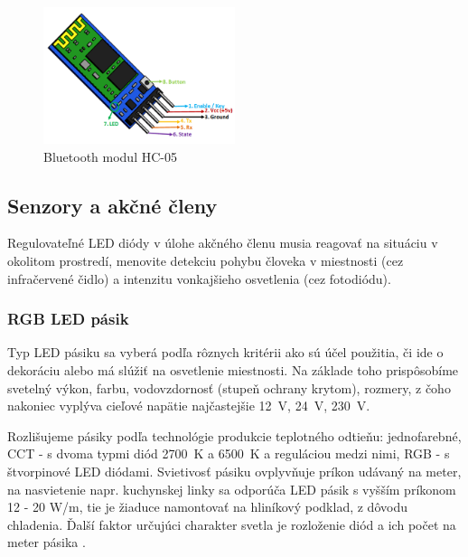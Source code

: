 \documentclass[12pt, a4paper]{article}
\begin{document}
\begin{figure}[h]
	\centering
	\includegraphics[width=0.5\textwidth]{assets/hc-05.png}
	\caption{Bluetooth modul HC-05 \cite{noauthor_hc-05_nodate}}
	\label{fig:hc-05}
\end{figure}

\subsection{Senzory a akčné členy}
Regulovateľné LED diódy v úlohe akčného členu musia reagovať na situáciu v okolitom prostredí, menovite detekciu pohybu človeka v miestnosti (cez infračervené čidlo) a intenzitu vonkajšieho osvetlenia (cez fotodiódu).

\subsubsection{RGB LED pásik}
Typ LED pásiku sa vyberá podľa rôznych kritérii ako sú účel použitia, či ide o dekoráciu alebo má slúžiť na osvetlenie miestnosti. Na základe toho prispôsobíme svetelný výkon, farbu, vodovzdornosť (stupeň ochrany krytom), rozmery, z čoho nakoniec vyplýva cieľové napätie najčastejšie 12~V, 24~V, 230~V.

Rozlišujeme pásiky podľa technológie produkcie teplotného odtieňu: jednofarebné, CCT - s dvoma typmi diód 2700~K a 6500~K a reguláciou medzi nimi, RGB - s štvorpinové LED diódami. Svietivosť pásiku ovplyvňuje príkon udávaný na meter, na nasvietenie napr. kuchynskej linky sa odporúča LED pásik s vyšším príkonom 12 - 20 W/m, tie je žiaduce namontovať na hliníkový podklad, z dôvodu chladenia. Ďalší faktor určujúci charakter svetla je rozloženie diód a ich počet na meter pásika \cite{123ledsk_ako_nodate}.
\end{document}
